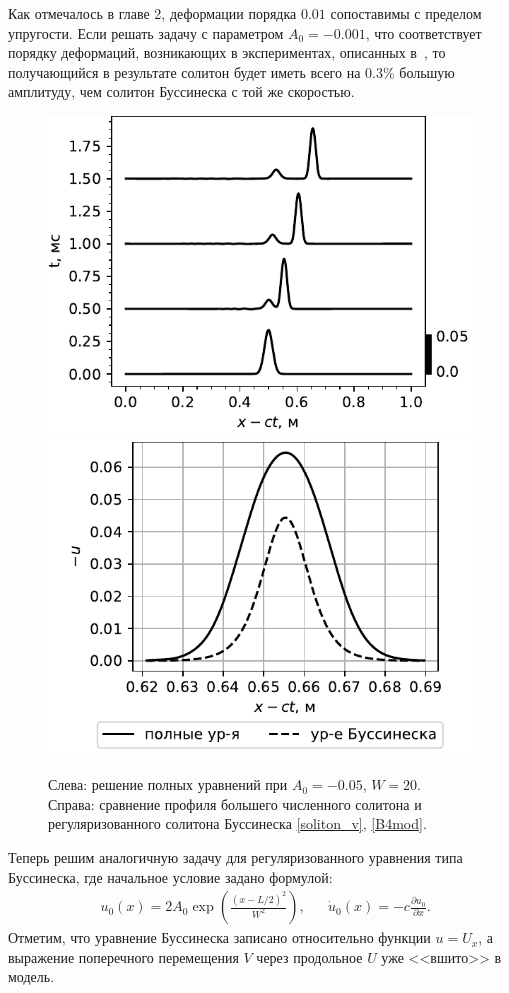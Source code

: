 \documentclass[12pt, a4paper]{report}
\newcommand{\lb}{\left (}
\newcommand{\rb}{\right )}
\newcommand{\pdiff}[2]{\frac{\partial #1}{\partial #2}}
\begin{document}
Как отмечалось в главе 2, деформации порядка $0.01$ сопоставимы с пределом упругости. Если решать задачу с параметром $A_0 = -0.001$, что соответствует порядку деформаций, возникающих в экспериментах, описанных в~\cite{Garbuzov}, то получающийся в результате солитон будет иметь всего на 0.3\% большую амплитуду, чем солитон Буссинеска с той же скоростью.
\begin{figure}[h!]
	\centering
	\includegraphics[width=0.48\linewidth]{Figures/SolEvolSmall2}
	\includegraphics[width=0.48\linewidth]{Figures/SolCompareSmall2}
	\caption{Слева: решение полных уравнений при $A_0=-0.05$, $W=20$. Справа: сравнение профиля большего численного солитона и регуляризованного солитона Буссинеска \eqref{soliton_v}, \eqref{B4mod}.}
	\label{fig:evolution2}
\end{figure}

Теперь решим аналогичную задачу для регуляризованного уравнения типа Буссинеска, где начальное условие задано формулой:
\begin{align}
\label{3_bq_ic}
& u_0 (x) = 2A_0 \exp\lb \frac{(x - L/2)^2}{W^2}\rb,&  &\dot{u}_0 (x) = -c \pdiff{u_0}{x}.
\end{align}
Отметим, что уравнение Буссинеска записано относительно функции $u = U_{x}$, а выражение поперечного перемещения $V$ через продольное $U$ уже <<вшито>> в модель.
\end{document}
